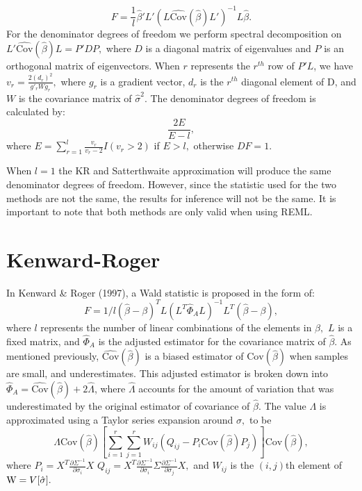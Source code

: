 \documentclass[12pt, twoside]{amherstthesis}
\begin{document}
\[F = \frac{1}{l}\hat\beta'L'(L\widehat {\text{Cov}}(\hat\beta) L')^{-1}L\hat\beta.\] For the denominator degrees of freedom we perform spectral decomposition on \(L'\widehat {\text{Cov}}(\hat\beta) L=P'DP,\) where \(D\) is a diagonal matrix of eigenvalues and \(P\) is an orthogonal matrix of eigenvectors. When \(r\) represents the \(r^{th}\) row of \(P'L\), we have \(v_r = \frac{2(d_r)^2}{g'_rWg_r},\) where \(g_r\) is a gradient vector, \(d_r\) is the \(r^{th}\) diagonal element of D, and \(W\) is the covariance matrix of \(\hat\sigma^2.\) The denominator degrees of freedom is calculated by:
\[\frac{2E}{E-l},\] where \(E = \sum_{r = 1}^{l} \frac{v_r}{v_r-2}I(v_r>2)\) if \(E >l,\) otherwise \(DF = 1.\)

When \(l =1\) the KR and Satterthwaite approximation will produce the same denominator degrees of freedom. However, since the statistic used for the two methods are not the same, the results for inference will not be the same. It is important to note that both methods are only valid when using REML.

\hypertarget{kenward-roger}{%
\section{Kenward-Roger}\label{kenward-roger}}

In Kenward \& Roger (1997), a Wald statistic is proposed in the form of:
\[F = 1/l(\hat\beta-\beta)^TL(L^T\hat\Phi_A L)^{-1}L^T(\hat\beta-\beta),\] where \(l\) represents the number of linear combinations of the elements in \(\beta,\) \(L\) is a fixed matrix, and \(\hat\Phi_A\) is the adjusted estimator for the covariance matrix of \(\hat\beta\). As mentioned previously, \(\widehat {\text{Cov}}(\hat\beta)\) is a biased estimator of \(\text{Cov}(\hat\beta)\) when samples are small, and underestimates. This adjusted estimator is broken down into \(\hat\Phi_A = \widehat {\text {Cov}}(\hat\beta) + 2\hat\Lambda\), where \(\hat\Lambda\) accounts for the amount of variation that was underestimated by the original estimator of covariance of \(\hat\beta\). The value \(\Lambda\) is approximated using a Taylor series expansion around \(\sigma,\) to be \[\Lambda\text{Cov}(\hat\beta)[\sum_{i=1}^{r}\sum_{j=1}^{r}W_{ij}(Q_{ij}-P_i\text{Cov}(\hat\beta)P_j)]\text{Cov}(\hat\beta),\] where
\(P_i = X^T\frac{\partial\Sigma^{-1}}{\partial\sigma_i}X\)
\(Q_{ij} = X^T \frac{\partial\Sigma^{-1}}{\partial\sigma_i}\Sigma\frac{\partial\Sigma^{-1}}{\partial\sigma_j}X,\) and \(W_{ij}\) is the \((i,j)\)th element of \(\text W = V[\hat\sigma].\)
\end{document}
